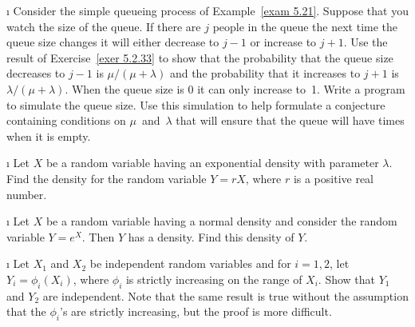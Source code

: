 \begin{LJSItem}
\i\label{exer 5.2.34} Consider the simple queueing process of Example~\ref{exam
5.21}.  Suppose that you watch the size of the queue.  If there are
$j$ people in the queue the next time the queue size changes it will either decrease
to $j - 1$ or increase to $j + 1$.  Use the result of Exercise~\ref{exer 5.2.33} to
show that the probability that the queue size decreases to $j - 1$ is
$\mu/(\mu +
\lambda)$ and the probability that it increases to $j + 1$ is $\lambda/(\mu +
\lambda)$.  When the queue size is 0 it can only increase to~1.  Write a program to
simulate the queue size.  Use this simulation to help formulate a conjecture
containing conditions on $\mu$~and~$\lambda$ that will ensure that the queue will have
times when it is empty.

\i\label{exer 5.2.36} Let $X$ be a random variable having an exponential density
with parameter
$\lambda$.  Find the density for the random variable $Y = rX$, where $r$ is a positive
real number.

\i\label{exer 5.2.37} Let $X$ be a random variable having a normal density and
consider the random variable $Y = e^X$.  Then $Y$ has a   density.  Find this density of $Y$.

\i\label{exer 5.2.38} Let $X_1$ and $X_2$ be independent random variables and for
$i = 1, 2$,  let
$Y_i = \phi_i(X_i)$, where $\phi_i$ is strictly increasing on the range of
$X_i$.  Show that $Y_1$ and $Y_2$ are independent.  Note that the same result is true
without the assumption that the $\phi_i$'s are strictly increasing, but the proof is
more difficult.

\end{LJSItem}
%
